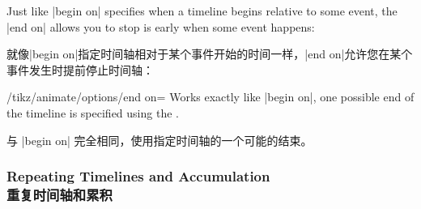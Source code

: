 Just like |begin on| specifies when a timeline begins relative to some event,
the |end on| allows you to stop is early when some event happens:

就像|begin on|指定时间轴相对于某个事件开始的时间一样，|end on|允许您在某个事件发生时提前停止时间轴：

\begin{key}{/tikz/animate/options/end on=}
    Works exactly like |begin on|, one possible end of the timeline is
    specified using the .

    与 |begin on| 完全相同，使用指定时间轴的一个可能的结束。


\end{key}


\subsubsection{Repeating Timelines and Accumulation\\重复时间轴和累积}

